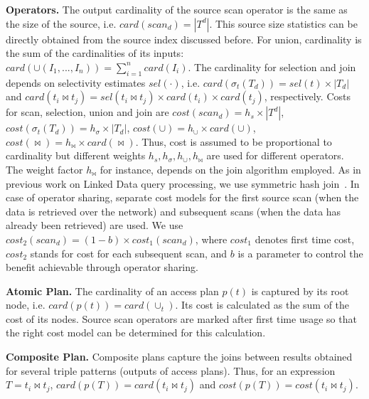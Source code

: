 \textbf{Operators.} The output cardinality of the source scan operator is the same as the size of the source, i.e. $card(scan_d) = |T^d|$. 
This source size statistics can be directly obtained from the source index discussed before. 
For union, cardinality is the sum of the cardinalities of its inputs: $card(\cup(I_1,...,I_n)) = \sum_{i=1}^n card(I_i)$. 
The cardinality for selection and join depends on selectivity estimates $sel(\cdot)$, i.e. $card(\sigma_t(T_d)) = sel(t) \times |T_d|$ and $card(t_i \Join t_j) =
sel(t_i \Join t_j) \times card(t_i) \times card(t_j)$, respectively. 
Costs for scan, selection, union and join are $cost(scan_d) = h_s \times |T^d|$, $cost(\sigma_t(T_d))=h_\sigma \times |T_d|$, $cost(\cup) =
h_\cup \times card(\cup)$, $cost(\Join) =
h_\Join \times card(\Join)$. Thus, cost is assumed to be proportional to cardinality but different weights $h_s,h_\sigma,h_\cup,h_\Join$ are used for different operators. The weight factor $h_\Join$ for instance, depends on the
join algorithm employed. As in previous work on Linked Data query processing, we use symmetric hash join~\cite{ladwig_linked_2010,sihjoin_2011}. In case of operator sharing, separate cost
models for the first source scan (when the data is retrieved over the
network) and subsequent scans (when the data has already been
retrieved) are used. We use $cost_2(scan_d) = (1 - b) \times cost_1(scan_d)$, where $cost_1$ denotes first time cost, $cost_2$ stands for cost for each subsequent scan, and $b$
is a parameter to control the benefit achievable through operator sharing.


\textbf{Atomic Plan.} The cardinality of an access plan $p(t)$ is captured by its root node, i.e. $card(p(t)) = card(\cup_t)$. Its cost is calculated as the sum of the cost of its nodes. Source scan operators are marked after first time usage so that the right cost model can be determined for this calculation. 

\textbf{Composite Plan.} Composite plans capture the joins between results obtained for several triple patterns (outputs of access plans). Thus, for an expression $T = t_i\Join t_j$, $card(p(T))  = card(t_i\Join t_j)$ and $cost(p(T))  = cost(t_i\Join t_j)$.


